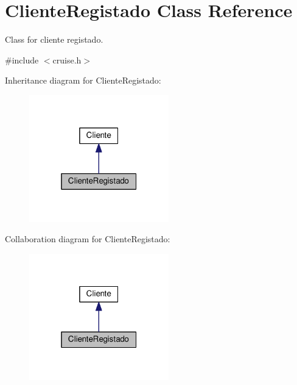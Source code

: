 \hypertarget{classClienteRegistado}{}\section{Cliente\+Registado Class Reference}
\label{classClienteRegistado}


Class for cliente registado.  




{\ttfamily \#include $<$cruise.\+h$>$}



Inheritance diagram for Cliente\+Registado\+:
\nopagebreak
\begin{figure}[H]
\begin{center}
\leavevmode
\includegraphics[width=172pt]{classClienteRegistado__inherit__graph}
\end{center}
\end{figure}


Collaboration diagram for Cliente\+Registado\+:
\nopagebreak
\begin{figure}[H]
\begin{center}
\leavevmode
\includegraphics[width=172pt]{classClienteRegistado__coll__graph}
\end{center}
\end{figure}
